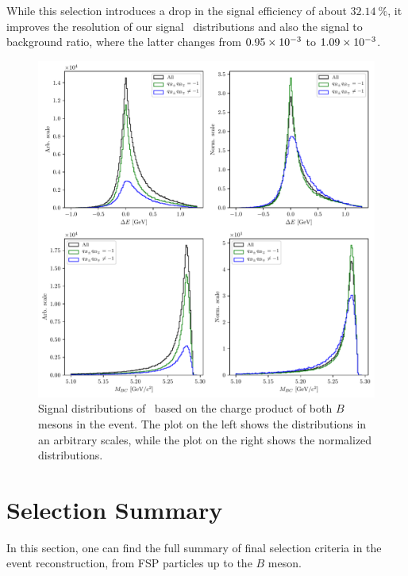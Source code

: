 While this selection introduces a drop in the signal efficiency of about $32.14~\%$, it improves the resolution of our signal \vars~distributions and also the signal to background ratio, where the latter changes from $0.95\times 10^{-3}$ to $1.09\times 10^{-3}$.

\begin{figure}[H]
	\centering
	\captionsetup{width=0.8\linewidth}
	\includegraphics[width=\linewidth]{fig/sig_categ}
	\caption{Signal distributions of \vars~based on the charge product of both $B$ mesons in the event. The plot on the left shows the distributions in an arbitrary scales, while the plot on the right shows the normalized distributions.}
	\label{fig:sig_categ}
\end{figure}

\section{Selection Summary}
\label{s:ss}
In this section, one can find the full summary of final selection criteria in the event reconstruction, from FSP particles up to the $B$ meson.


